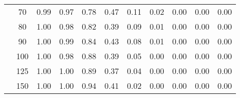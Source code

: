 \begin{table}[t]
\begin{center}
\begin{subtable}[c]{\textwidth}
\begin{center}
\begin{tabular}{rcccccccccc}
                                        & \multicolumn{1}{c|}{70}  & \num{0.99}  & \num{0.97}  & \num{0.78}  & \num{0.47}  & \num{0.11}  & \num{0.02}  & \num{0.00}  & \num{0.00}  & \num{0.00}  \\
                                        & \multicolumn{1}{c|}{80}  & \num{1.00}  & \num{0.98}  & \num{0.82}  & \num{0.39}  & \num{0.09}  & \num{0.01}  & \num{0.00}  & \num{0.00}  & \num{0.00}  \\
                                        & \multicolumn{1}{c|}{90}  & \num{1.00}  & \num{0.99}  & \num{0.84}  & \num{0.43}  & \num{0.08}  & \num{0.01}  & \num{0.00}  & \num{0.00}  & \num{0.00}  \\
                                        & \multicolumn{1}{c|}{100}  & \num{1.00}  & \num{0.98}  & \num{0.88}  & \num{0.39}  & \num{0.05}  & \num{0.00}  & \num{0.00}  & \num{0.00}  & \num{0.00}  \\
                                        & \multicolumn{1}{c|}{125}  & \num{1.00}  & \num{1.00}  & \num{0.89}  & \num{0.37}  & \num{0.04}  & \num{0.00}  & \num{0.00}  & \num{0.00}  & \num{0.00}  \\
                                        & \multicolumn{1}{c|}{150}  & \num{1.00}  & \num{1.00}  & \num{0.94}  & \num{0.41}  & \num{0.02}  & \num{0.00}  & \num{0.00}  & \num{0.00}  & \num{0.00}  \\
                                    \end{tabular}
            \end{center}
        \end{subtable}

        \vspace{5mm}


\end{center}
\end{table}
